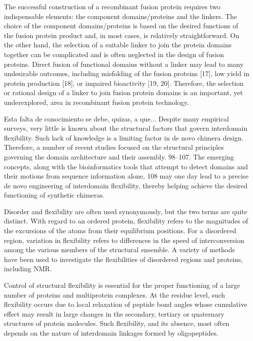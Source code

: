 The successful construction of a recombinant fusion protein requires two indispensable elements: 
the component domains/proteins and the linkers.
The choice of the component domains/proteins is based on the desired functions of the fusion protein product and, in most cases, is relatively straightforward. 
On the other hand, the selection of a suitable linker to join the protein domains together can be complicated and is often neglected in the design of fusion proteins.
Direct fusion of functional domains without a linker may lead to many undesirable outcomes, including misfolding of the fusion proteins [17], low yield in protein production
[18], or impaired bioactivity [19, 20]. 
Therefore, the selection or rational design of a linker to join fusion protein domains is an important, yet underexplored, area in recombinant fusion protein technology.


Esta falta de conocimiento se debe, quizas, a que...
Despite many empirical surveys, very little is known about the structural factors that govern interdomain flexibility. 
Such lack of knowledge is a limiting factor in de novo chimera design. Therefore, a number of recent studies focused on the structural principles governing the domain architecture and their assembly. 98–107.
The emerging concepts, along with the bioinformatics tools that attempt to detect domains and their motions from sequence information alone, 108 may one day lead to a precise de novo engineering of interdomain flexibility, thereby helping
achieve the desired functioning of synthetic chimeras.


Disorder and flexibility are often used synonymously, but the two terms are quite distinct\cite{radivojac2004protein}. 
With regard to an ordered protein, flexibility refers to the magnitudes of the excursions of the atoms from their equilibrium positions.
For a disordered region, variation in flexibility refers to differences in the speed of interconversion among the various members of the structural ensemble. 
A variety of methods have been used to investigate the flexibilities of disordered regions and proteins, including NMR.

Control of structural flexibility is essential for the proper functioning of a large number of proteins and multiprotein complexes. 
At the residue level, such flexibility occurs due to local relaxation of peptide bond angles whose cumulative effect may result in large changes in the secondary, tertiary or quaternary structures of protein molecules. 
Such flexibility, and its absence, most often depends on the nature of interdomain linkages formed by oligopeptides.

